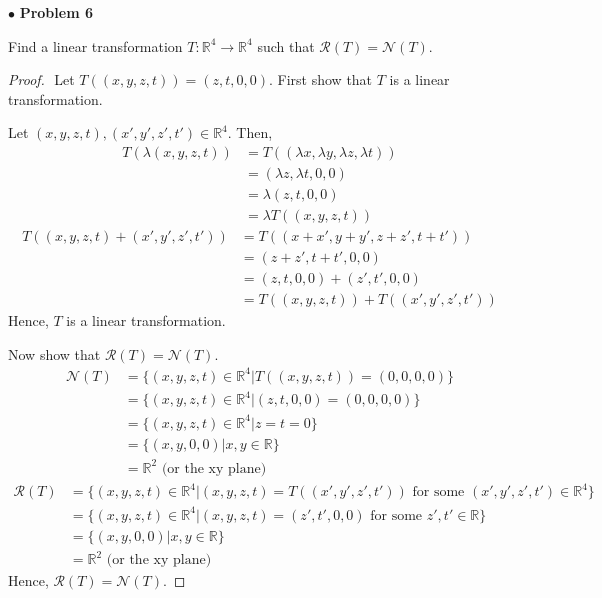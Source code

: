 \documentclass{article}
\begin{document}
\newpage
$ \bullet$ \textbf{Problem 6}
\medskip

\begin{itshape}
Find a linear transformation $T: \mathbb{R}^4 \to \mathbb{R}^4$ such that $\mathcal{R}(T)=\mathcal{N}(T)$.
\end{itshape}
\medskip

\begin{proof}
$ $\newline
Let $T((x,y,z,t)) = (z,t,0,0)$. First show that $T $ is a linear transformation.

Let $(x,y,z,t), (x',y',z',t')  \in \mathbb{R}^4$. Then,
\begin{align*}
T( \lambda (x,y,z,t)) & = T( (\lambda x, \lambda y, \lambda z ,\lambda t)) \\
&=  (\lambda z, \lambda t, 0 , 0) \\
& =  \lambda (z,t,0,0) \\
&= \lambda T((x,y,z,t))
\end{align*}
\begin{align*}
T((x,y,z,t) + (x',y',z',t')) &= T( (x+x', y+y', z+z', t+t')) \\
&= (z+z', t+t', 0,0) \\
&= (z,t,0,0) + (z',t',0,0) \\
&= T((x,y,z,t)) + T((x',y',z',t'))
\end{align*}
Hence, $T$ is a linear transformation.
\medskip

Now show that $\mathcal{R}(T) = \mathcal{N}(T)$.
\begin{align*}
\mathcal{N}(T) &= \{ (x,y,z,t) \in \mathbb{R}^4 | T((x,y,z,t)) = (0,0,0,0) \} \\
&= \{ (x,y,z,t) \in \mathbb{R}^4 | (z,t,0,0) = (0,0,0,0) \} \\
&= \{ (x,y,z,t) \in \mathbb{R}^4 | z=t=0 \} \\
&= \{ (x,y,0,0) | x,y \in \mathbb{R} \} \\
&= \mathbb{R}^2 \text{ (or the xy plane)}
\end{align*}
\begin{align*}
\mathcal{R}(T) &= \{ (x,y,z,t) \in \mathbb{R}^4 | (x,y,z,t) = T ((x',y',z',t')) \text{ for some } (x',y',z',t') \in \mathbb{R}^4 \} \\
&= \{ (x,y,z,t) \in \mathbb{R}^4 | (x,y,z,t) = (z',t', 0,0) \text{ for some } z',t' \in \mathbb{R} \} \\
&= \{ (x,y,0,0) | x,y \in \mathbb{R} \} \\
&= \mathbb{R}^2 \text{ (or the xy plane)}
\end{align*}
Hence, $\mathcal{R}(T) = \mathcal{N}(T)$.
\end{proof}
\end{document}
